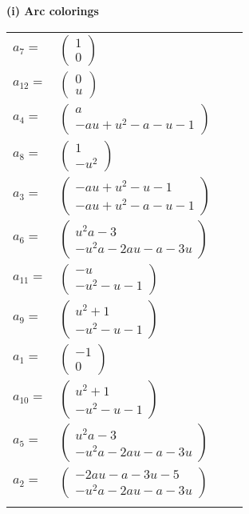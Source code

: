 \documentclass[1p]{elsarticle_modified}
\theoremstyle{definition}
\begin{document}
\flushleft \textbf{(i) Arc colorings}\\
\begin{tabular}{m{7pt} m{180pt} m{7pt} m{180pt} }
\flushright $a_{7}=$&$\begin{pmatrix}1\\0\end{pmatrix}$ \\
\flushright $a_{12}=$&$\begin{pmatrix}0\\u\end{pmatrix}$ \\
\flushright $a_{4}=$&$\begin{pmatrix}a\\- a u+u^2- a- u-1\end{pmatrix}$ \\
\flushright $a_{8}=$&$\begin{pmatrix}1\\- u^2\end{pmatrix}$ \\
\flushright $a_{3}=$&$\begin{pmatrix}- a u+u^2- u-1\\- a u+u^2- a- u-1\end{pmatrix}$ \\
\flushright $a_{6}=$&$\begin{pmatrix}u^2 a-3\\- u^2 a-2 a u- a-3 u\end{pmatrix}$ \\
\flushright $a_{11}=$&$\begin{pmatrix}- u\\- u^2- u-1\end{pmatrix}$ \\
\flushright $a_{9}=$&$\begin{pmatrix}u^2+1\\- u^2- u-1\end{pmatrix}$ \\
\flushright $a_{1}=$&$\begin{pmatrix}-1\\0\end{pmatrix}$ \\
\flushright $a_{10}=$&$\begin{pmatrix}u^2+1\\- u^2- u-1\end{pmatrix}$ \\
\flushright $a_{5}=$&$\begin{pmatrix}u^2 a-3\\- u^2 a-2 a u- a-3 u\end{pmatrix}$ \\
\flushright $a_{2}=$&$\begin{pmatrix}-2 a u- a-3 u-5\\- u^2 a-2 a u- a-3 u\end{pmatrix}$\\&\end{tabular}
\end{document}
